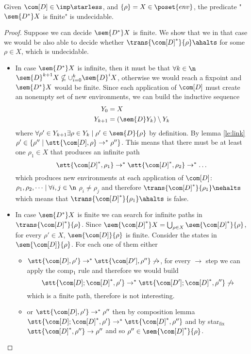 \begin{lemma}\label{le:infiniteness}
  Given \(\com[D]\in\imp\starless\), and \(\{\rho\} = X \in
  \poset{env}\), the predicate "\(\sem{D^*}X\) is finite" is
  undecidable.
\end{lemma}

\begin{proof}
  Suppose we can decide \(\sem{D^*}X\) is finite. We show that we in
  that case we would be also able to decide whether
  \(\trans{\com[D]^*}{\rho}\ahalts\) for some \(\rho \in X\), which is
  undecidable.%
  \begin{itemize}
  \item In case \(\sem{D^*}X\) is infinite, then it must be that
    \(\forall k \in \n\)
    \(\sem{D}^{k+1}X \nsubseteq \cup_{i=0}^k\sem{D}^iX\), otherwise we
    would reach a fixpoint and \(\sem{D^*}X\) would be finite. Since
    each application of \(\com[D]\) must create an nonempty set of new
    environments, we can build the inductive sequence
    \begin{align*}
      Y_0 & = X \\
      Y_{k+1} & = (\sem{D}Y_k)\setminus Y_k
    \end{align*}
    where \(\forall \rho' \in Y_{k+1} \exists \rho \in Y_k \mid \rho'
    \in \sem{D}\{\rho\}\) by definition. By lemma \ref{le:link}
    \(\rho' \in \{\rho'' \mid \stt{\com[D], \rho} \to^*
    \rho''\}\). This means that there must be at least one \(\rho_1\in
    X\) that produces an infinite path \[\stt{\com[D]^*,
      \rho_1}\to^*\stt{\com[D]^*, \rho_2}\to^*\dots \] which produces
    new environments at each application of \(\com[D]\): \(\rho_1,
    \rho_2, \dots \mid \forall i,j \in \n\) \(\rho_i \neq \rho_j\) and
    therefore \(\trans{\com[D]^*}{\rho_1} \nehalts\) which means that
    \(\trans{\com[D]^*}{\rho_1}\ahalts\) is false.
  \item In case \(\sem{D^*}X\) is finite we can search for infinite
    paths in \(\trans{\com[D]^*}{\rho}\). Since
    \(\sem{\com[D]^*}X = \bigcup_{\rho\in X}\sem{\com[D]^*}\{\rho\}\),
    for every \(\rho' \in X\), \(\sem{\com[D]}\{\rho\}\) is
    finite. Consider the states in \(\sem{\com[D]}\{\rho\}\). For each
    one of them either
    \begin{itemize}
    \item
      \(\stt{\com[D], \rho'} \to^* \stt{\com[D'], \rho''} \not\to\),
      for every \(\to\) step we can apply the comp\(_1\) rule and
      therefore we would build
      \[\stt{\com[D];\com[D]^*, \rho'} \to^* \stt{\com[D']; \com[D]^*,
          \rho''} \not\to\] which is a finite path, therefore is not
      interesting.
    \item or \(\stt{\com[D], \rho'} \to^* \rho''\) then by composition
      lemma
      \(\stt{\com[D]; \com[D]^*, \rho'} \to^* \stt{\com[D]^*,
        \rho''}\) and by star\(_{\text{fix}}\)
      \(\stt{\com[D]^*, \rho''} \to \rho''\) and so
      \(\rho'' \in \sem{\com[D]^*}\{\rho\}\).
    \end{itemize}
  \end{itemize}
\end{proof}
